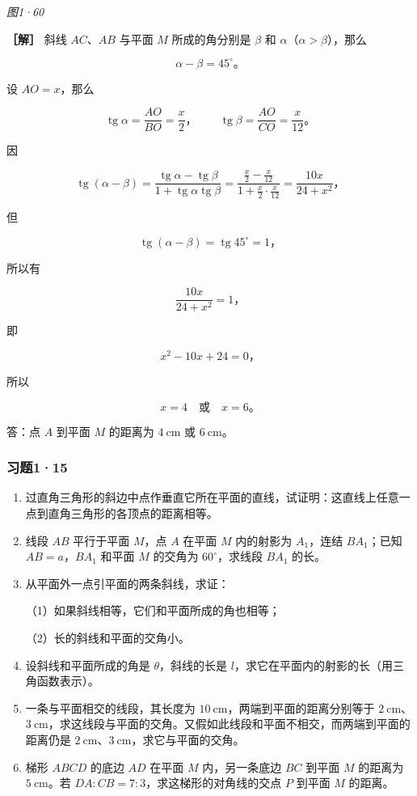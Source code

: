 \emph{图1·60}

\textbf{［解］} 斜线 \(AC\)、\(AB\) 与平面 \(M\) 所成的角分别是
\(\beta\) 和 \(\alpha\)（\(\alpha>\beta\)），那么

\[
\alpha-\beta=45^\circ\text{。}
\]

设 \(AO=x\)，那么

\[
\operatorname{tg}\alpha=\frac{AO}{BO}=\frac{x}{2}\text{，}\qquad
\operatorname{tg}\beta=\frac{AO}{CO}=\frac{x}{12}\text{。}
\]

因

\[
\operatorname{tg}(\alpha-\beta)
=
\frac{\operatorname{tg}\alpha-\operatorname{tg}\beta}
{1+\operatorname{tg}\alpha\operatorname{tg}\beta}
=
\frac{\frac{x}{2}-\frac{x}{12}}
{1+\frac{x}{2}\cdot\frac{x}{12}}
=
\frac{10x}{24+x^2}\text{，}
\]

但

\[
\operatorname{tg}(\alpha-\beta)=\operatorname{tg}45^\circ=1\text{，}
\]

所以有

\[
\frac{10x}{24+x^2}=1\text{，}
\]

即

\[
x^2-10x+24=0\text{，}
\]

所以

\[
x=4\quad\text{或}\quad x=6\text{。}
\]

答：点 \(A\) 到平面 \(M\) 的距离为 \(4\ \mathrm{cm}\) 或
\(6\ \mathrm{cm}\)。

\subsubsection{习题1·15}

\begin{enumerate}
\item
  过直角三角形的斜边中点作垂直它所在平面的直线，试证明：这直线上任意一点到直角三角形的各顶点的距离相等。
\item
  线段 \(AB\) 平行于平面 \(M\)，点 \(A\) 在平面 \(M\) 内的射影为
  \(A_1\)，连结 \(BA_1\)；已知 \(AB=a\)，\(BA_1\) 和平面 \(M\) 的交角为
  \(60^\circ\)，求线段 \(BA_1\) 的长。
\item
  从平面外一点引平面的两条斜线，求证：

  （1）如果斜线相等，它们和平面所成的角也相等；

  （2）长的斜线和平面的交角小。
\item
  设斜线和平面所成的角是 \(\theta\)，斜线的长是
  \(l\)，求它在平面内的射影的长（用三角函数表示）。
\item
  一条与平面相交的线段，其长度为
  \(10\ \mathrm{cm}\)，两端到平面的距离分别等于
  \(2\ \mathrm{cm}\)、\(3\ \mathrm{cm}\)，求这线段与平面的交角。又假如此线段和平面不相交，而两端到平面的距离仍是
  \(2\ \mathrm{cm}\)、\(3\ \mathrm{cm}\)，求它与平面的交角。
\item
  梯形 \(ABCD\) 的底边 \(AD\) 在平面 \(M\) 内，另一条底边 \(BC\) 到平面
  \(M\) 的距离为 \(5\ \mathrm{cm}\)。若
  \(DA:CB=7:3\)，求这梯形的对角线的交点 \(P\) 到平面 \(M\) 的距离。
\end{enumerate}

